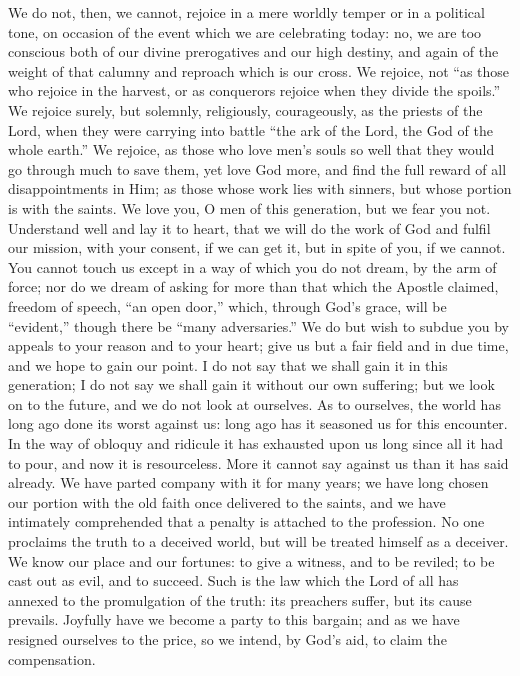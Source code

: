 We do not, then, we cannot, rejoice in a mere worldly
temper or in a political tone, on occasion of the event
which we are celebrating today: no, we are too conscious
both of our divine prerogatives and our high destiny, and
again of the weight of that calumny and reproach which is
our cross. We rejoice, not ``as those who rejoice in
the harvest, or as conquerors rejoice when they divide
the spoils.'' We rejoice surely, but solemnly,
religiously, courageously, as the priests of the Lord,
when they were carrying into battle ``the ark of the
Lord, the God of the whole earth.'' We rejoice, as
those who love men's souls so well that they would go
through much to save them, yet love God more, and find
the full reward of all disappointments in Him; as those
whose work lies with sinners, but whose portion is with
the saints. We love you, O men of this generation, but we
fear you not. Understand well and lay it to heart, that
we will do the work of God and fulfil our mission, with
your consent, if we can get it, but in spite of you, if
we cannot. You cannot touch us except in a way of which
you do not dream, by the arm of force; nor do we dream of
asking for more than that which the Apostle claimed,
freedom of speech, ``an open door,'' which,
through God's grace, will be ``evident,'' though
there be ``many adversaries.'' We do but wish to
subdue you by appeals to your reason and to your heart;
give us but a fair field and in due time, and we hope to
gain our point. I do not say that we shall gain it in
this generation; I do not say we shall gain it without
our own suffering; but we look on to the future, and we
do not look at ourselves. As to ourselves, the world has
long ago done its worst against us: long ago has it
seasoned us for this encounter. In the way of obloquy and
ridicule it has exhausted upon us long since all it had
to pour, and now it is resourceless. More it cannot say
against us than it has said already. We have parted
company with it for many years; we have long chosen our
portion with the old faith once delivered to the saints,
and we have intimately comprehended that a penalty is
attached to the profession. No one proclaims the truth to
a deceived world, but will be treated himself as a
deceiver. We know our place and our fortunes: to give a
witness, and to be reviled; to be cast out as evil, and
to succeed. Such is the law which the Lord of all has
annexed to the promulgation of the truth: its preachers
suffer, but its cause prevails. Joyfully have we become a
party to this bargain; and as we have resigned ourselves
to the price, so we intend, by God's aid, to claim the
compensation.

